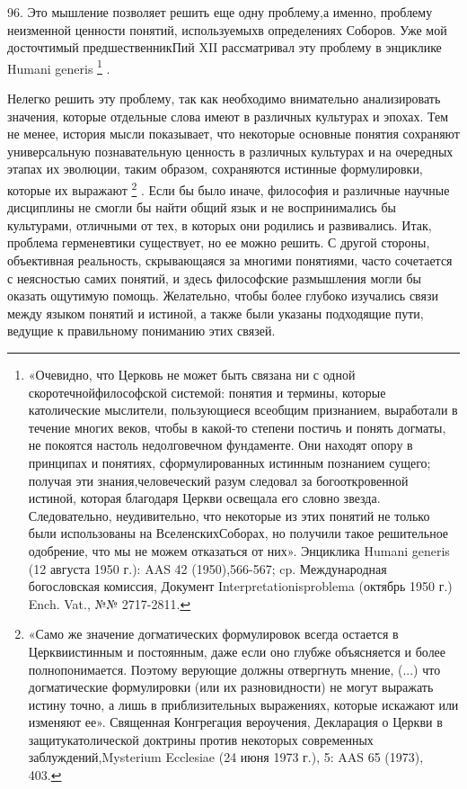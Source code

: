 \documentclass[a5paper,10pt]{article}
\begin{document}
96. Это мышление позволяет решить еще одну проблему,а именно, проблему
неизменной ценности понятий, используемыхв определениях Соборов. Уже мой
досточтимый предшественникПий XII рассматривал эту проблему в энциклике Humani
generis \footnote{«Очевидно, что Церковь не может быть связана ни с одной
скоротечнойфилософской системой: понятия и термины, которые католические
мыслители, пользующиеся всеобщим признанием, выработали в течение многих веков,
чтобы в какой-то степени постичь и понять догматы, не покоятся настоль
недолговечном фундаменте. Они находят опору в принципах и понятиях,
сформулированных истинным познанием сущего; получая эти знания,человеческий
разум следовал за богооткровенной истиной, которая благодаря Церкви освещала
его словно звезда. Следовательно, неудивительно, что некоторые из этих понятий
не только были использованы на ВселенскихСоборах, но получили такое решительное
одобрение, что мы не можем отказаться от них». Энциклика Humani generis (12
августа 1950 г.): AAS 42 (1950),566-567; cp. Международная богословская
комиссия, Документ Interpretationisproblema (октябрь 1950 г.) Ench. Vat., №№
2717-2811.} .

Нелегко решить эту проблему, так как необходимо внимательно анализировать
значения, которые отдельные слова имеют в различных культурах и эпохах. Тем не
менее, история мысли показывает, что некоторые основные понятия сохраняют
универсальную познавательную ценность в различных культурах и на очередных
этапах их эволюции, таким образом, сохраняются истинные формулировки, которые
их выражают \footnote{«Само же значение догматических формулировок всегда
остается в Церквиистинным и постоянным, даже если оно глубже объясняется и
более полнопонимается. Поэтому верующие должны отвергнуть мнение, (...) что
догматические формулировки (или их разновидности) не могут выражать истину
точно, а лишь в приблизительных выражениях, которые искажают или изменяют ее».
Священная Конгрегация вероучения, Декларация о Церкви в защитукатолической
доктрины против некоторых современных заблуждений,Mysterium Ecclesiae (24 июня
1973 г.), 5: AAS 65 (1973), 403.} . Если бы было иначе, философия и различные
научные дисциплины не смогли бы найти общий язык и не воспринимались бы
культурами, отличными от тех, в которых они родились и развивались. Итак,
проблема герменевтики существует, но ее можно решить. С другой стороны,
объективная реальность, скрывающаяся за многими понятиями, часто сочетается с
неясностью самих понятий, и здесь философские размышления могли бы оказать
ощутимую помощь. Желательно, чтобы более глубоко изучались связи между языком
понятий и истиной, а также были указаны подходящие пути, ведущие к правильному
пониманию этих связей.
\end{document}
